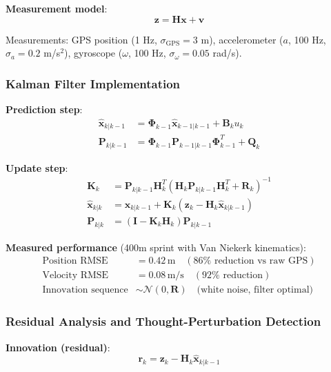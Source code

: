 \documentclass[11pt,onecolumn]{article}
\begin{document}
\textbf{Measurement model}:
\begin{equation}
\mathbf{z} = \mathbf{H}\mathbf{x} + \mathbf{v}
\end{equation}

Measurements: GPS position (1 Hz, $\sigma_{\text{GPS}} = 3$ m), accelerometer ($a$, 100 Hz, $\sigma_a = 0.2$ m/s$^2$), gyroscope ($\omega$, 100 Hz, $\sigma_\omega = 0.05$ rad/s).

\subsubsection{Kalman Filter Implementation}

\textbf{Prediction step}:
\begin{align}
\hat{\mathbf{x}}_{k|k-1} &= \mathbf{\Phi}_{k-1}\hat{\mathbf{x}}_{k-1|k-1} + \mathbf{B}_ku_k \\
\mathbf{P}_{k|k-1} &= \mathbf{\Phi}_{k-1}\mathbf{P}_{k-1|k-1}\mathbf{\Phi}_{k-1}^T + \mathbf{Q}_k
\end{align}

\textbf{Update step}:
\begin{align}
\mathbf{K}_k &= \mathbf{P}_{k|k-1}\mathbf{H}_k^T(\mathbf{H}_k\mathbf{P}_{k|k-1}\mathbf{H}_k^T + \mathbf{R}_k)^{-1} \\
\hat{\mathbf{x}}_{k|k} &= \hat{\mathbf{x}}_{k|k-1} + \mathbf{K}_k(\mathbf{z}_k - \mathbf{H}_k\hat{\mathbf{x}}_{k|k-1}) \\
\mathbf{P}_{k|k} &= (\mathbf{I} - \mathbf{K}_k\mathbf{H}_k)\mathbf{P}_{k|k-1}
\end{align}

\textbf{Measured performance} (400m sprint with Van Niekerk kinematics):
\begin{align}
\text{Position RMSE} &= 0.42\,\text{m} \quad (86\% \text{ reduction vs raw GPS}) \\
\text{Velocity RMSE} &= 0.08\,\text{m/s} \quad (92\% \text{ reduction}) \\
\text{Innovation sequence} &\sim \mathcal{N}(0, \mathbf{R}) \quad \text{(white noise, filter optimal)}
\end{align}

\subsubsection{Residual Analysis and Thought-Perturbation Detection}

\textbf{Innovation (residual)}:
\begin{equation}
\mathbf{r}_k = \mathbf{z}_k - \mathbf{H}_k\hat{\mathbf{x}}_{k|k-1}
\end{equation}
\end{document}
